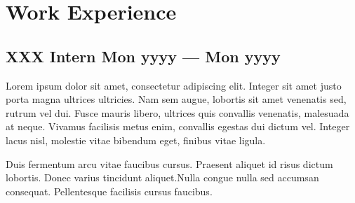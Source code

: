 \section{Work Experience}

\subsection*{XXX Intern \hfill Mon yyyy --- Mon yyyy} 
    \begin{zitemize}
        \item Lorem ipsum dolor sit amet, consectetur adipiscing elit. Integer sit amet justo porta magna ultrices ultricies. Nam sem augue, lobortis sit amet venenatis sed, rutrum vel dui. Fusce mauris libero, ultrices quis convallis venenatis, malesuada at neque. Vivamus facilisis metus enim, convallis egestas dui dictum vel. Integer lacus nisl, molestie vitae bibendum eget, finibus vitae ligula. 
        \item Duis fermentum arcu vitae faucibus cursus. Praesent aliquet id risus dictum lobortis. Donec varius tincidunt aliquet.Nulla congue nulla sed accumsan consequat. Pellentesque facilisis cursus faucibus.
    \end{zitemize}


